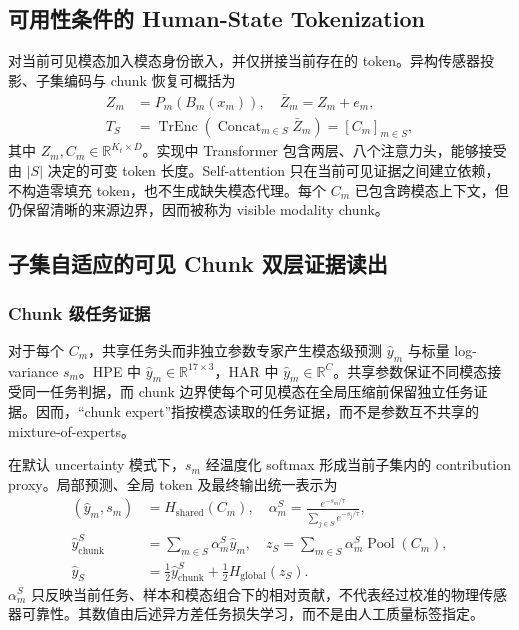 \documentclass[journal]{IEEEtran}
\begin{document}
\subsection{可用性条件的 Human-State Tokenization}

对当前可见模态加入模态身份嵌入，并仅拼接当前存在的 token。异构传感器投影、子集编码与 chunk 恢复可概括为
\begin{equation}
\begin{aligned}
Z_m&=P_m(B_m(x_m)),\quad \bar Z_m=Z_m+e_m,\\
T_S&=\operatorname{TrEnc}\!\left(\operatorname{Concat}_{m\in S}\bar Z_m\right)
=[C_m]_{m\in S},
\end{aligned}
\label{eq:body_token}
\end{equation}
其中 $Z_m,C_m\in\mathbb R^{K_t\times D}$。实现中 Transformer 包含两层、八个注意力头，能够接受由 $|S|$ 决定的可变 token 长度。Self-attention 只在当前可见证据之间建立依赖，不构造零填充 token，也不生成缺失模态代理。每个 $C_m$ 已包含跨模态上下文，但仍保留清晰的来源边界，因而被称为 visible modality chunk。

\subsection{子集自适应的可见 Chunk 双层证据读出}

\subsubsection{Chunk 级任务证据}

对于每个 $C_m$，共享任务头而非独立参数专家产生模态级预测 $\hat y_m$ 与标量 log-variance $s_m$。HPE 中 $\hat y_m\in\mathbb{R}^{17\times3}$，HAR 中 $\hat y_m\in\mathbb{R}^{C}$。共享参数保证不同模态接受同一任务判据，而 chunk 边界使每个可见模态在全局压缩前保留独立任务证据。因而，“chunk expert”指按模态读取的任务证据，而不是参数互不共享的 mixture-of-experts。

在默认 uncertainty 模式下，$s_m$ 经温度化 softmax 形成当前子集内的 contribution proxy。局部预测、全局 token 及最终输出统一表示为
\begin{equation}
\begin{aligned}
(\hat y_m,s_m)&=H_{\mathrm{shared}}(C_m),\quad
\alpha_m^S=\frac{e^{-s_m/\tau}}{\sum_{j\in S}e^{-s_j/\tau}},\\
\hat y_{\mathrm{chunk}}^S&=\sum_{m\in S}\alpha_m^S\hat y_m,\quad
z_S=\sum_{m\in S}\alpha_m^S\operatorname{Pool}(C_m),\\
\hat y_S&=\tfrac12\hat y_{\mathrm{chunk}}^S+
\tfrac12H_{\mathrm{global}}(z_S).
\end{aligned}
\label{eq:reliability_weight}
\end{equation}
$\alpha_m^S$ 只反映当前任务、样本和模态组合下的相对贡献，不代表经过校准的物理传感器可靠性。其数值由后述异方差任务损失学习，而不是由人工质量标签指定。
\end{document}
